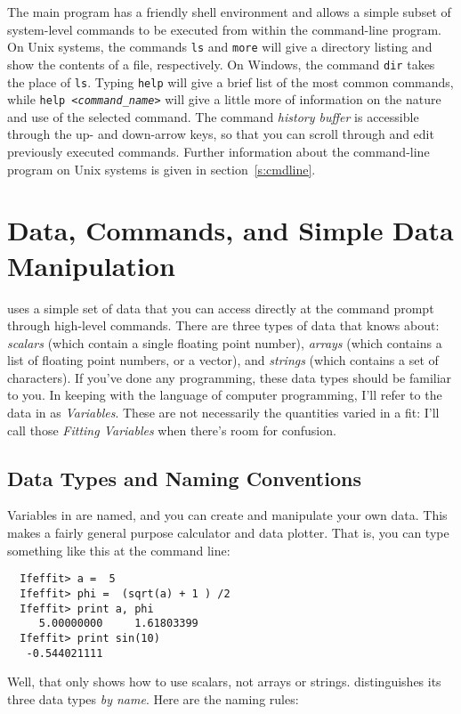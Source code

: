 \documentclass[11pt]{article}
\begin{document}
The main {\ifeffit} program has a friendly shell environment and allows a
simple subset of system-level commands to be executed from within the
command-line program.  On Unix systems, the commands {\tt{ls}} and
{\tt{more}} will give a directory listing and show the contents of a file,
respectively.  On Windows, the command {\tt{dir}} takes the place of
{\tt{ls}}.  Typing {\tt{help}} will give a brief list of the most common
commands, while {\tt{help \emph{<command\_name>}}} will give a little more
of information on the nature and use of the selected command.  The command
{\emph{history buffer}} is accessible through the up- and down-arrow keys,
so that you can scroll through and edit previously executed commands.
Further information about the command-line program on Unix systems is given
in section~{\ref{s:cmdline}}.

\clearpage
\section{Data, Commands, and Simple Data Manipulation}
\label{s:datatypes}


{\ifeffit} uses a simple set of data that you can access directly at the
command prompt through high-level commands.  There are three types of data
that {\ifeffit} knows about: {\emph{scalars}} (which contain a single
floating point number), {\emph{arrays}} (which contains a list of floating
point numbers, or a vector), and {\emph{strings}} (which contains a set of
characters).  If you've done any programming, these data types should be
familiar to you.  In keeping with the language of computer programming,
I'll refer to the data in {\ifeffit} as {\emph{Variables}}.  These are not
necessarily the quantities varied in a fit: I'll call those {\emph{Fitting
    Variables}} when there's room for confusion.

\subsection{Data Types and Naming Conventions}\label{s:datatypes:names}

Variables in {\ifeffit} are named, and you can create and manipulate
your own data.  This makes {\ifeffit} a fairly general purpose calculator
and data plotter.  That is, you can type something like this at the
{\ifeffit} command line:

{\small\begin{verbatim}
  Ifeffit> a =  5
  Ifeffit> phi =  (sqrt(a) + 1 ) /2
  Ifeffit> print a, phi
     5.00000000     1.61803399
  Ifeffit> print sin(10)
   -0.544021111
\end{verbatim}}\noindent
Well, that only shows how to use {{scalars}}, not arrays or strings.
{\ifeffit} distinguishes its three data types {\emph{by name}}.  Here are
the naming rules:
\end{document}
